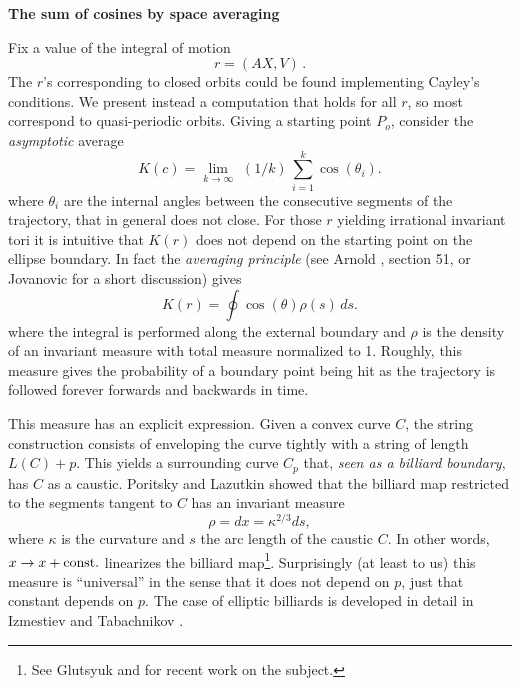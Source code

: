 \documentclass[11pt]{article}
\begin{document}
\begin{center}
{\Large {\bf    The sum of cosines by space averaging}} %
\end{center}


Fix a  value of  the integral  of motion  \begin{equation} r = (AX,V) \,.  \label{integral}  \end{equation}
    The  $r$'s  corresponding to closed orbits  could  be found implementing Cayley's conditions.
We present  instead a computation that holds for all $r$, so most correspond to quasi-periodic orbits.     Giving a starting point  $P_o$,  consider the {\it asymptotic} average 
 \begin{equation}     K(c) =  \lim_{k \to \infty}\,\,     (1/k) \,  \sum_{i=1}^k   \cos(\theta_i) .
 \end{equation}
 where  $\theta_i$ are the internal angles between the consecutive segments of the trajectory, that in general does not close.
For those  $r$ yielding irrational invariant tori      it is   intuitive  that $ K(r) $  does not depend on the starting point on the  ellipse boundary.
 In fact the {\it averaging principle}  (see Arnold \cite{Arnold},
section 51, or Jovanovic  \cite{Jovanovic} for a short discussion)  gives
   \begin{equation}    K(r) =   \oint   \cos(\theta) \rho(s) \, ds  .
   \end{equation} 
where the integral is performed along the external boundary  and  $\rho$  is the density of an invariant measure  with total measure normalized to 1.
Roughly,  this measure  gives  the probability of a boundary point being hit as the trajectory is followed forever forwards and backwards in time.

This measure has an explicit expression.   %
  Given a convex curve $C$,  the  string construction consists of enveloping the curve  tightly with a string
of length $ L(C) + p $.   This  yields a  surrounding curve $C_p$ that, {\it seen as a billiard boundary}, has $C$ as a caustic.  Poritsky  \cite{Poritsky} and Lazutkin \cite{Lazutkin}  showed that  the billiard map restricted to the segments
tangent to $C$ has an invariant measure 
\begin{equation}  \rho  =  dx = \kappa^{2/3} ds, 
\end{equation} 
where $\kappa$   is the curvature and  $s$ the arc length of  the caustic $C$.  In other words, $x \to  x + {\rm const.}$ linearizes the billiard map\footnote{See    Glutsyuk  \cite{Glutsyuk}  and \cite{Zhang} for recent work on the subject.}.  Surprisingly   (at least to us)   this measure is ``universal'' in the sense that it does not depend on $p$, just that constant depends on $p$. The case of  elliptic billiards is  developed   in detail in Izmestiev and  Tabachnikov  \cite{Izmestiev}.
\end{document}
